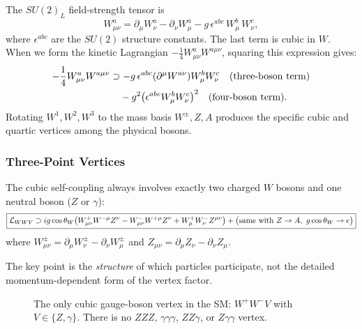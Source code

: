The $SU(2)_L$ field-strength tensor is
\begin{equation}
  W^a_{\mu\nu} = \partial_\mu W^a_\nu - \partial_\nu W^a_\mu
                 - g\,\epsilon^{abc}\,W^b_\mu\,W^c_\nu,
  \label{eq:lec19:w-field-strength}
\end{equation}
where $\epsilon^{abc}$ are the $SU(2)$ structure constants. The
last term is cubic in $W$. When we form the kinetic Lagrangian
$-\frac14 W^a_{\mu\nu}W^{a\mu\nu}$, squaring this expression gives:
\begin{align}
  -\frac14 W^a_{\mu\nu}W^{a\mu\nu}
  &\supset
  -g\,\epsilon^{abc}(\partial^\mu W^{a\nu})W^b_\mu W^c_\nu
  \quad\text{(three-boson term)}
  \notag\\
  &\quad
  - g^2\bigl(\epsilon^{abc}W^b_\mu W^c_\nu\bigr)^2
  \quad\text{(four-boson term)}.
  \label{eq:lec19:kinetic-expansion}
\end{align}
Rotating $W^1,W^2,W^3$ to the mass basis $W^\pm, Z, A$ produces the
specific cubic and quartic vertices among the physical bosons.

\subsubsection*{Three-Point Vertices}

The cubic self-coupling always involves exactly two charged $W$ bosons
and one neutral boson ($Z$ or $\gamma$):
\begin{equation}
  \boxed{
    \mathcal{L}_{WWV}
    \supset
    ig\cos\theta_W
    \bigl(W^+_{\mu\nu}W^{-\mu}Z^\nu - W^-_{\mu\nu}W^{+\mu}Z^\nu
    + W^+_\mu W^-_\nu Z^{\mu\nu}\bigr)
    + \bigl(\text{same with }Z\to A,\ g\cos\theta_W\to e\bigr)
  }
  \label{eq:lec19:wwv-three-point}
\end{equation}
where $W^\pm_{\mu\nu} = \partial_\mu W^\pm_\nu - \partial_\nu W^\pm_\mu$
and $Z_{\mu\nu} = \partial_\mu Z_\nu - \partial_\nu Z_\mu$.

The key point is the \emph{structure} of which particles participate,
not the detailed momentum-dependent form of the vertex factor.

\begin{figure}[ht]
\centering
{}
\caption{The only cubic gauge-boson vertex in the SM: $W^+W^-V$ with
  $V\in\{Z,\gamma\}$. There is no $ZZZ$, $\gamma\gamma\gamma$,
  $ZZ\gamma$, or $Z\gamma\gamma$ vertex.}
\label{fig:lec19:three-point}
\end{figure}

